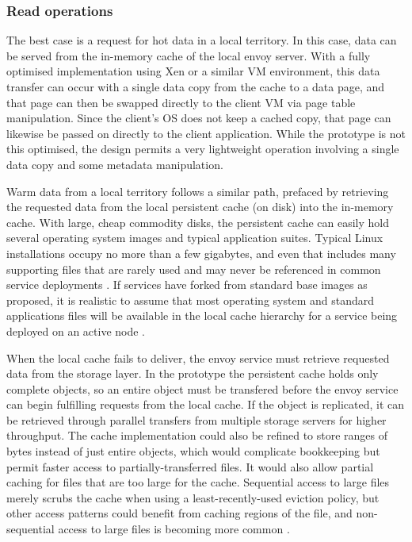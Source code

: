 \subsubsection{Read operations}\label{sec:data-paths-read}

The best case is a request for hot data in a local territory. In this case, data can be served from the in-memory cache of the local envoy server. With a fully optimised implementation using Xen or a similar VM environment, this data transfer can occur with a single data copy from the cache to a data page, and that page can then be swapped directly to the client VM via page table manipulation. Since the client's OS does not keep a cached copy, that page can likewise be passed on directly to the client application. While the prototype is not this optimised, the design permits a very lightweight operation involving a single data copy and some metadata manipulation.

Warm data from a local territory follows a similar path, prefaced by retrieving the requested data from the local persistent cache (on disk) into the in-memory cache. With large, cheap commodity disks, the persistent cache can easily hold several operating system images and typical application suites. Typical Linux installations occupy no more than a few gigabytes, and even that includes many supporting files that are rarely used and may never be referenced in common service deployments \cite{gibson98b}. If services have forked from standard base images as proposed, it is realistic to assume that most operating system and standard applications files will be available in the local cache hierarchy for a service being deployed on an active node \cite{klosterman}.

When the local cache fails to deliver, the envoy service must retrieve requested data from the storage layer. In the prototype the persistent cache holds only complete objects, so an entire object must be transfered before the envoy service can begin fulfilling requests from the local cache. If the object is replicated, it can be retrieved through parallel transfers from multiple storage servers for higher throughput. The cache implementation could also be refined to store ranges of bytes instead of just entire objects, which would complicate bookkeeping but permit faster access to partially-transferred files. It would also allow partial caching for files that are too large for the cache. Sequential access to large files merely scrubs the cache when using a least-recently-used eviction policy, but other access patterns could benefit from caching regions of the file, and non-sequential access to large files is becoming more common \cite{roselli}.

